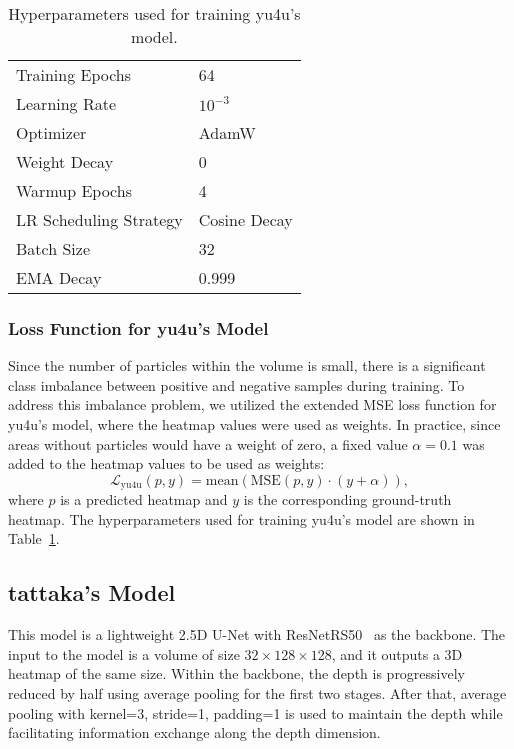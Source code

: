 \begin{table}[tb]
    \centering
    \footnotesize
    \begin{tabular}{ll}
        \toprule
        Training Epochs & 64 \\
        Learning Rate & $10^{-3}$ \\
        Optimizer & AdamW \\
        Weight Decay & 0 \\
        Warmup Epochs & 4 \\
        LR Scheduling Strategy & Cosine Decay \\
        Batch Size & 32 \\
        EMA Decay & 0.999 \\
        \bottomrule
    \end{tabular}
    \caption{Hyperparameters used for training yu4u's model.}
    \label{tab:hyperparams1}
\end{table}


\subsubsection{Loss Function for yu4u's Model}
Since the number of particles within the volume is small, there is a significant class imbalance between positive and negative samples during training.
To address this imbalance problem, we utilized the extended MSE loss function for yu4u's model, where the heatmap values were used as weights.
In practice, since areas without particles would have a weight of zero, a fixed value $\alpha = 0.1$ was added to the heatmap values to be used as weights:
\begin{equation}
    \mathcal{L}_\text{yu4u}(p, y) = \text{mean} (\text{MSE}(p, y) \cdot (y + \alpha)),
\end{equation}
where $p$ is a predicted heatmap and $y$ is the corresponding ground-truth heatmap.
The hyperparameters used for training yu4u's model are shown in Table~\ref{tab:hyperparams1}.


\subsection{tattaka's Model}
This model is a lightweight 2.5D U-Net with ResNetRS50~\cite{Bello2021} as the backbone.
The input to the model is a volume of size $32 \times 128 \times 128$, and it outputs a 3D heatmap of the same size. Within the backbone, the depth is progressively reduced by half using average pooling for the first two stages. After that, average pooling with kernel=3, stride=1, padding=1 is used to maintain the depth while facilitating information exchange along the depth dimension.

